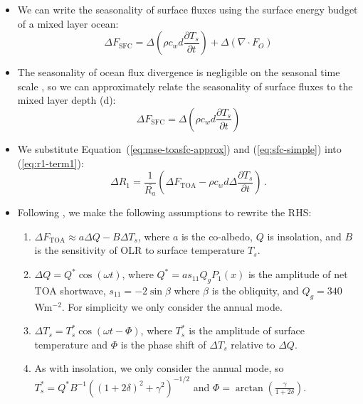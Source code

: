 \documentclass{ametsocV5}
\begin{document}
\begin{itemize}
  \item We can write the seasonality of surface fluxes using the surface energy budget of a mixed layer ocean:
        \begin{equation}
          \Delta F_{\mathrm{SFC}} = \Delta\left(\rho c_{w} d \frac{\partial T_{s}}{\partial t}\right) + \Delta ( \nabla\cdot F_{O})
        \end{equation}
  \item The seasonality of ocean flux divergence is negligible on the seasonal time scale \citep{roberts2017}, so we can approximately relate the seasonality of surface fluxes to the mixed layer depth (d):
        \begin{equation} \label{eq:sfc-simple}
          \Delta F_{\mathrm{SFC}} = \Delta\left(\rho c_{w} d \frac{\partial T_{s}}{\partial t}\right)
        \end{equation}
  \item We substitute Equation~(\ref{eq:mse-toasfc-approx}) and (\ref{eq:sfc-simple}) into (\ref{eq:r1-term1}):
        \begin{equation} \label{eq:r1-linear2}
          \Delta R_{1} = \frac{1}{\overline{R_{a}}}\left(\Delta F_{\mathrm{TOA}}-\rho c_{w} d \Delta\frac{\partial T_{s}}{\partial t}\right) \, .
        \end{equation}
  \item Following \cite{rose2017}, we make the following assumptions to rewrite the RHS:
        \begin{enumerate}
          \item $\Delta F_{\mathrm{TOA}} \approx a\Delta Q - B\Delta T_{s}$, where $a$ is the co-albedo, $Q$ is insolation, and $B$ is the sensitivity of OLR to surface temperature $T_{s}$.
          \item $\Delta Q = Q^{*}\cos(\omega t)$, where $Q^{*}=as_{11}Q_{g}P_{1}(x)$ is the amplitude of net TOA shortwave, $s_{11}=-2\sin{\beta}$ where $\beta$ is the obliquity, and $Q_{g}=340$ Wm$^{-2}$. For simplicity we only consider the annual mode.
          \item $\Delta T_{s} = T_{s}^{*}\cos(\omega t - \Phi)$, where $T_{s}^{*}$ is the amplitude of surface temperature and $\Phi$ is the phase shift of $\Delta T_{s}$ relative to $\Delta Q$.
          \item As with insolation, we only consider the annual mode, so $T_{s}^{*}=Q^{*}B^{-1}\left((1+2\delta)^{2}+\gamma^{2}\right)^{-1/2}$ and $\Phi=\arctan\left(\frac{\gamma}{1+2\delta}\right)$.
        \end{enumerate}

\end{itemize}
\end{document}
